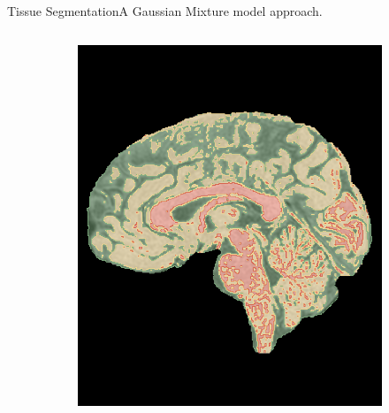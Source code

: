 \documentclass[]{standalone}
\begin{document}
\begin{frame}{Tissue Segmentation}{A Gaussian Mixture model approach.}
\begin{columns}
\begin{column}{0.7\textwidth}
\begin{figure}[h!]
\begin{subfigure}{0.45\textwidth}
					\includegraphics[scale=0.112]{./IMG/segmented_lateral.png}
				\end{subfigure}

			\end{figure}
			\end{column}
		\end{columns}
	\end{frame}
\end{document}

